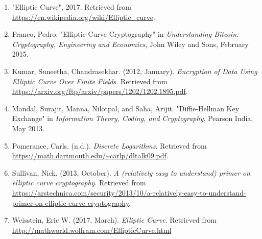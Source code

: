 \begin{enumerate}[(1)]
\item\label{wikipedia2017}
"Elliptic Curve", 2017. Retrieved from \url {https://en.wikipedia.org/wiki/Elliptic_curve}.

\item\label{Franco}
Franco, Pedro. "Elliptic Curve Cryptography" in \emph{Understanding Bitcoin: Cryptography, Engineering and Economics}, John Wiley and Sons, February 2015.

\item \label{Kumar}
Kumar, Suneetha, Chandrasekhar. (2012, January). \emph{Encryption of Data  Using
Elliptic Curve Over Finite Fields}. Retrieved from \newline 
\url{https://arxiv.org/ftp/arxiv/papers/1202/1202.1895.pdf}.

\item \label{Mandal}
Mandal, Surajit, Manna, Nilotpal, and Saha, Arijit. "Diffie-Hellman \newline
Key Exchange" in \emph{Information Theory, Coding, and Cryptography}, Pearson India, May 2013.

\item \label{Pomerance}
Pomerance, Carls. (n.d.). \emph{Discrete Logarithms}. Retrieved from \url{https://math.dartmouth.edu/~carlp/dltalk09.pdf}.

\item\label{Sullivan}
Sullivan, Nick. (2013, October). \emph{A (relatively easy to understand) primer on elliptic curve cryptography}. Retrieved from \url{https://arstechnica.com/security/2013/10/a-relatively-easy-to-understand-primer-on}\newline\url{-elliptic-curve-cryptography}.

\item \label{Wolframalpha}
Weisstein, Eric W. (2017, March). \emph{Elliptic Curve}. Retrieved from \url{http://mathworld.wolfram.com/EllipticCurve.html}

\end{enumerate}
